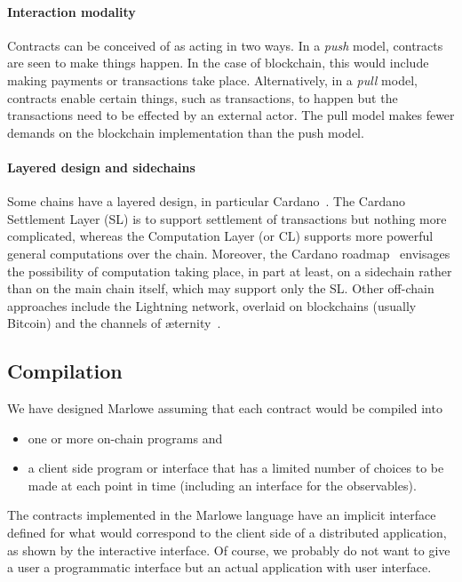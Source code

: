 \documentclass[runningheads]{llncs}
\begin{document}
\paragraph{Interaction modality}

Contracts can be conceived of as acting in two ways. In a \emph{push} model, contracts are seen to make things happen. 
In the case of blockchain, this would include making payments or transactions take place. 
Alternatively, in a \emph{pull} model, contracts enable certain things, such as transactions,  to happen but the 
transactions need to be effected by an external actor. The pull model makes fewer demands on the blockchain 
implementation than the push model.

\paragraph{Layered design and sidechains}

Some chains have a layered design, in particular Cardano~\cite{cardano}. The Cardano Settlement Layer (SL) is to 
support settlement of transactions but nothing more complicated, whereas the Computation Layer (or CL) supports more 
powerful general computations over the chain. Moreover, the Cardano roadmap~\cite{cardano-rationale} envisages the 
possibility of computation taking place, in part at least, on a sidechain rather than on the main chain itself, which 
may support only the SL. Other off-chain approaches include the Lightning network, overlaid on blockchains (usually 
Bitcoin) and the channels of \ae{}ternity~\cite{aeternity}.



\subsection{Compilation}
\label{sec:compilation}

We have designed Marlowe assuming that each contract would be compiled into
\begin{itemize} 
\item one or more on-chain programs and 
\item a client side program or interface that has a limited number of choices to be made at each point in time 
(including an interface for the observables). 
\end{itemize}
The contracts implemented in the Marlowe language have an implicit interface defined for what would correspond to the 
client side of a distributed application, as shown by the interactive interface. Of course, we probably do not want to 
give a user a programmatic interface but an actual application with user interface. 
\end{document}
